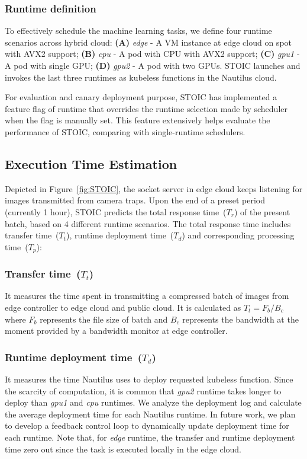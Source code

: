  \BlankLine
 \subsubsection{Runtime definition}
 To effectively schedule the machine learning tasks, we define four runtime scenarios across hybrid cloud: \textbf{(A)} \textit{edge} - A VM instance at edge cloud on spot with AVX2 support; \textbf{(B)} \textit{cpu} - A pod with CPU with AVX2 support; \textbf{(C)} \textit{gpu1} - A pod with single GPU; \textbf{(D)} \textit{gpu2} - A pod with two GPUs. STOIC launches and invokes the last three runtimes as kubeless functions in the Nautilus cloud. 
 
 For evaluation and canary deployment purpose, STOIC has implemented a feature flag of runtime that overrides the runtime selection made by scheduler when the flag is manually set. This feature extensively helps evaluate the performance of STOIC, comparing with single-runtime schedulers.
 
 
 \subsection{Execution Time Estimation}
 Depicted in Figure~\ref{fig:STOIC}, the socket server in edge cloud keeps listening for images transmitted from camera traps. Upon the end of a preset period (currently 1 hour), STOIC predicts the total response time~($T_r$) of the present batch, based on 4 different runtime scenarios. The total response time includes transfer time~($T_t$), runtime deployment time~($T_d$) and corresponding processing time~($T_p$): 
 
 \subsubsection{Transfer time~($T_t$)} It measures the time spent in transmitting a compressed batch of images from edge controller to edge cloud and public cloud. It is calculated as ${T_t = F_b / B_c}$ where $F_b$ represents the file size of batch and $B_c$ represents the bandwidth at the moment provided by a bandwidth monitor at edge controller. 
 
 \subsubsection{Runtime deployment time~($T_d$)} It measures the time Nautilus uses to deploy requested kubeless function. Since the scarcity of computation, it is common that \textit{gpu2} runtime takes longer to deploy than \textit{gpu1} and \textit{cpu} runtimes. We analyze the deployment log and calculate the average deployment time for each Nautilus runtime. In future work, we plan to develop a feedback control loop to dynamically update deployment time for each runtime. Note that, for \textit{edge} runtime, the transfer and runtime deployment time zero out since the task is executed locally in the edge cloud.
 
